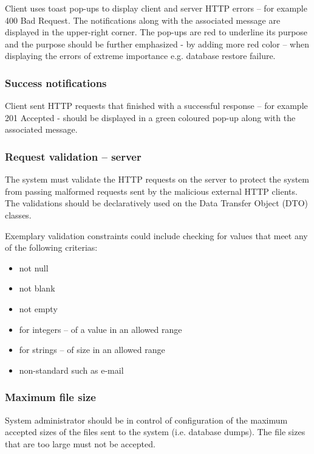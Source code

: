 \documentclass[a4paper,twoside,12pt]{book}
\begin{document}
Client uses toast pop-ups to display client and server HTTP errors \cite{bib:rfc7231} – for example 400 Bad Request. The notifications along with the associated message are displayed in the upper-right corner. The pop-ups are red to underline its purpose and the purpose should be further emphasized - by adding more red color – when displaying the errors of extreme importance e.g. database restore failure.

\subsubsection{Success notifications}

Client sent HTTP requests that finished with a successful response \cite{bib:rfc7231} – for example 201 Accepted - should be displayed in a green coloured pop-up along with the associated message.

\subsubsection{Request validation – server}

The system must validate the HTTP requests on the server to protect the system from passing malformed requests sent by the malicious external HTTP clients. The validations should be declaratively used on the Data Transfer Object (DTO) classes. 

Exemplary validation constraints could include checking for values that meet any of the following criterias:
\begin{itemize}
\item not null
\item not blank
\item not empty
\item for integers – of a value in an allowed range
\item for strings – of size in an allowed range
\item non-standard such as e-mail
\end{itemize}

\subsubsection{Maximum file size}

System administrator should be in control of configuration of the maximum accepted sizes of the files sent to the system (i.e. database dumps). The file sizes that are too large must not be accepted.
\end{document}
